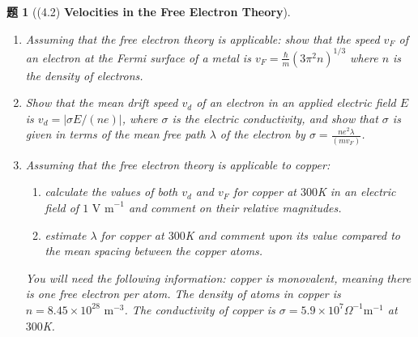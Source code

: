 \documentclass[UTF8,10pt,a4paper]{article}
\theoremstyle{Problem}
\newtheorem{prob}{题}
\theoremstyle{Solution}
\providecommand{\abs}[1]{\left\lvert#1\right\rvert}
\begin{document}
\begin{prob}[(4.2) \textbf{Velocities in the Free Electron Theory}]
    \begin{enumerate}
        \item[(a)] Assuming that the free electron theory is applicable: show that the speed $v_F$ of an electron at the Fermi surface of a metal is $v_F=\frac{\hbar}{m}(3\pi^2n)^{1/3}$ where $n$ is the density of electrons.
        \item[(b)] Show that the mean drift speed $v_d$ of an electron in an applied electric field $E$ is $v_d=\abs{\sigma E/(ne)}$, where $\sigma$ is the electric conductivity, and show that $\sigma$ is given in terms of the mean free path $\lambda$ of the electron by $\sigma=\frac{ne^2\lambda}{(mv_F)}$.
        \item[(c)] Assuming that the free electron theory is applicable to copper:
        \begin{enumerate}
            \item[(i)] calculate the values of both $v_d$ and $v_F$ for copper at $300$K in an electric field of $1\text{ V m}^{-1}$ and comment on their relative magnitudes.
            \item[(ii)] estimate $\lambda$ for copper at $300$K and comment upon its value compared to the mean spacing between the copper atoms.
        \end{enumerate}
        You will need the following information: copper is monovalent, meaning there is one free electron per atom. The density of atoms in copper is $n=8.45\times 10^{28}\text{ m}^{-3}$. The conductivity of copper is $\sigma=5.9\times 10^7\Omega^{-1}\text{m}^{-1}$ at $300$K.
    \end{enumerate}
\end{prob}
\end{document}
